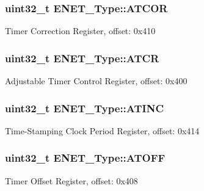 \subsubsection[{\texorpdfstring{A\+T\+C\+OR}{ATCOR}}]{ uint32\+\_\+t E\+N\+E\+T\+\_\+\+Type\+::\+A\+T\+C\+OR}\hypertarget{structENET__Type_a659e7687729f9e57fb36b6174eda7a62}{}\label{structENET__Type_a659e7687729f9e57fb36b6174eda7a62}
Timer Correction Register, offset\+: 0x410 
\subsubsection[{\texorpdfstring{A\+T\+CR}{ATCR}}]{ uint32\+\_\+t E\+N\+E\+T\+\_\+\+Type\+::\+A\+T\+CR}\hypertarget{structENET__Type_abeca43c3170448c5b52e3387a18ac9e6}{}\label{structENET__Type_abeca43c3170448c5b52e3387a18ac9e6}
Adjustable Timer Control Register, offset\+: 0x400 
\subsubsection[{\texorpdfstring{A\+T\+I\+NC}{ATINC}}]{ uint32\+\_\+t E\+N\+E\+T\+\_\+\+Type\+::\+A\+T\+I\+NC}\hypertarget{structENET__Type_ad73f5b3d70dbf900b7bb783cfe6998c1}{}\label{structENET__Type_ad73f5b3d70dbf900b7bb783cfe6998c1}
Time-\/\+Stamping Clock Period Register, offset\+: 0x414 
\subsubsection[{\texorpdfstring{A\+T\+O\+FF}{ATOFF}}]{ uint32\+\_\+t E\+N\+E\+T\+\_\+\+Type\+::\+A\+T\+O\+FF}\hypertarget{structENET__Type_a7d884a3ad9e74534e6543dbb7bc957c5}{}\label{structENET__Type_a7d884a3ad9e74534e6543dbb7bc957c5}
Timer Offset Register, offset\+: 0x408 
